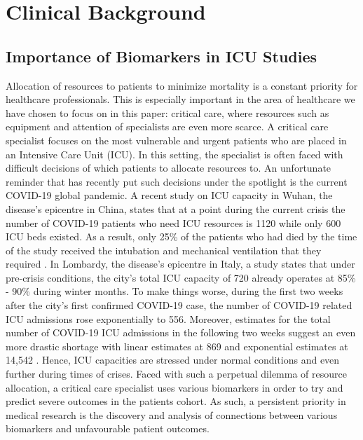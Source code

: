 
\chapter{Clinical Background} %

\label{chapter1} %


\section{Importance of Biomarkers in ICU Studies}

Allocation of resources to patients to minimize mortality is a constant priority for healthcare professionals. This is especially important in the area of healthcare we have chosen to focus on in this paper: critical care,  where resources such as equipment and attention of specialists are even more scarce. A critical care specialist focuses on the most vulnerable and urgent patients who are placed in an Intensive Care Unit (ICU). In this setting, the specialist is often faced with difficult decisions of which patients to allocate resources to. An unfortunate reminder that has recently put such decisions under the spotlight is the current COVID-19 global pandemic. A recent study on ICU capacity in Wuhan, the disease's epicentre in China, states that at a point during the current crisis the number of COVID-19 patients who need ICU resources is 1120 while only 600 ICU beds existed. As a result, only 25\% of the patients who had died by the time of the study received the intubation and mechanical ventilation that they required \citep{wu2020characteristics}. In Lombardy, the disease's epicentre in Italy, a study states that under pre-crisis conditions,  the city's  total ICU capacity of 720 already operates at 85\% - 90\% during winter months. To make things worse, during the first two weeks after the city's first confirmed COVID-19 case, the number of COVID-19 related ICU admissions rose exponentially to 556. Moreover, estimates for the total number of COVID-19 ICU admissions in the following two weeks suggest an even more drastic shortage with linear estimates at 869 and exponential estimates at 14,542 \citep{grasselli2020}. Hence, ICU capacities are stressed under normal conditions and even further during times of crises.  Faced with such a perpetual dilemma of resource allocation, a critical care specialist uses various biomarkers in order to try and predict severe outcomes in the patients cohort. As such, a persistent priority in medical research is the discovery and analysis of connections between various biomarkers and unfavourable patient outcomes. 


